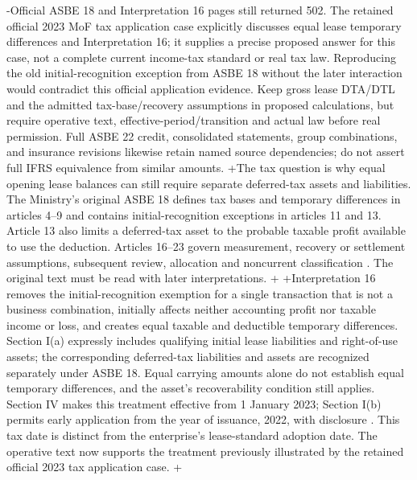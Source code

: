 -Official ASBE 18 and Interpretation 16 pages still returned 502. The retained official 2023 MoF tax application case explicitly discusses equal lease temporary differences and Interpretation 16; it supplies a precise proposed answer for this case, not a complete current income-tax standard or real tax law. Reproducing the old initial-recognition exception from ASBE 18 without the later interaction would contradict this official application evidence. Keep gross lease DTA/DTL and the admitted tax-base/recovery assumptions in proposed calculations, but require operative text, effective-period/transition and actual law before real permission. Full ASBE 22 credit, consolidated statements, group combinations, and insurance revisions likewise retain named source dependencies; do not assert full IFRS equivalence from similar amounts.
+The tax question is why equal opening lease balances can still require separate deferred-tax assets and liabilities. The Ministry's original ASBE 18 defines tax bases and temporary differences in articles 4--9 and contains initial-recognition exceptions in articles 11 and 13. Article 13 also limits a deferred-tax asset to the probable taxable profit available to use the deduction. Articles 16--23 govern measurement, recovery or settlement assumptions, subsequent review, allocation and noncurrent classification \citep{mofasbe18}. The original text must be read with later interpretations.
+
+Interpretation 16 removes the initial-recognition exemption for a single transaction that is not a business combination, initially affects neither accounting profit nor taxable income or loss, and creates equal taxable and deductible temporary differences. Section I(a) expressly includes qualifying initial lease liabilities and right-of-use assets; the corresponding deferred-tax liabilities and assets are recognized separately under ASBE 18. Equal carrying amounts alone do not establish equal temporary differences, and the asset's recoverability condition still applies. Section IV makes this treatment effective from 1 January 2023; Section I(b) permits early application from the year of issuance, 2022, with disclosure \citep[secs.\ I(a)--(b), IV]{mofinterpretation16}. This tax date is distinct from the enterprise's lease-standard adoption date. The operative text now supports the treatment previously illustrated by the retained official 2023 tax application case.
+
